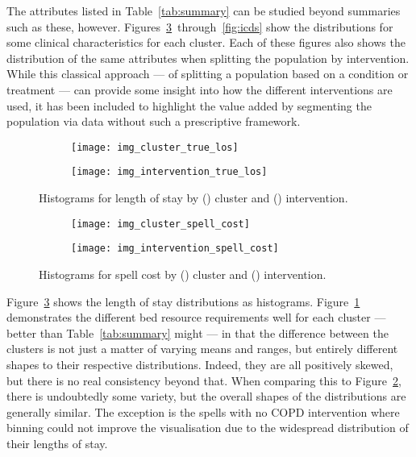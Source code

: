 The attributes listed in Table~\ref{tab:summary} can be studied beyond summaries
such as these, however. Figures~\ref{fig:los}~through~\ref{fig:icds} show the
distributions for some clinical characteristics for each cluster. Each of these
figures also shows the distribution of the same attributes when splitting the
population by intervention. While this classical approach --- of splitting a
population based on a condition or treatment --- can provide some insight into
how the different interventions are used, it has been included to highlight the
value added by segmenting the population via data without such a prescriptive
framework.

\begin{figure}
    \centering
    \begin{subfigure}{.5\imgwidth}
        \texttt{[image: img\_cluster\_true\_los]}
        \caption{}\label{fig:cluster_los}
    \end{subfigure}\hfill%
    \begin{subfigure}{.5\imgwidth}
        \texttt{[image: img\_intervention\_true\_los]}
        \caption{}\label{fig:intervention_los}
    \end{subfigure}
    \caption{%
        Histograms for length of stay by () cluster and
        () intervention.
    }\label{fig:los}
\end{figure}

\begin{figure}
    \centering
    \begin{subfigure}{.5\imgwidth}
        \texttt{[image: img\_cluster\_spell\_cost]}
        \caption{}\label{fig:cluster_cost}
    \end{subfigure}\hfill%
    \begin{subfigure}{.5\imgwidth}
        \texttt{[image: img\_intervention\_spell\_cost]}
        \caption{}\label{fig:intervention_cost}
    \end{subfigure}
    \caption{%
        Histograms for spell cost by () cluster and
        () intervention.
    }\label{fig:cost}
\end{figure}

Figure~\ref{fig:los} shows the length of stay distributions as histograms.
Figure~\ref{fig:cluster_los} demonstrates the different bed resource
requirements well for each cluster --- better than Table~\ref{tab:summary} might
--- in that the difference between the clusters is not just a matter of
varying means and ranges, but entirely different shapes to their respective
distributions. Indeed, they are all positively skewed, but there is no real
consistency beyond that. When comparing this to
Figure~\ref{fig:intervention_los}, there is undoubtedly some variety, but the
overall shapes of the distributions are generally similar. The exception is the
spells with no COPD intervention where binning could not improve the
visualisation due to the widespread distribution of their lengths of stay.

